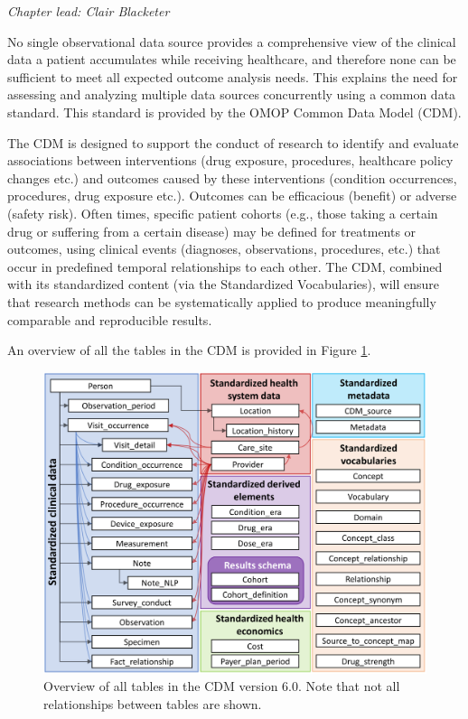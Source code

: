 \documentclass[11pt]{book}
\theoremstyle{definition}
\theoremstyle{definition}
\theoremstyle{definition}
\theoremstyle{remark}
\begin{document}
\emph{Chapter lead: Clair Blacketer}

No single observational data source provides a comprehensive view of the clinical data a patient accumulates while receiving healthcare, and therefore none can be sufficient to meet all expected outcome analysis needs. This explains the need for assessing and analyzing multiple data sources concurrently using a common data standard. This standard is provided by the OMOP Common Data Model (CDM).

The CDM is designed to support the conduct of research to identify and evaluate associations between interventions (drug exposure, procedures, healthcare policy changes etc.) and outcomes caused by these interventions (condition occurrences, procedures, drug exposure etc.). Outcomes can be efficacious (benefit) or adverse (safety risk). Often times, specific patient cohorts (e.g., those taking a certain drug or suffering from a certain disease) may be defined for treatments or outcomes, using clinical events (diagnoses, observations, procedures, etc.) that occur in predefined temporal relationships to each other. The CDM, combined with its standardized content (via the Standardized Vocabularies), will ensure that research methods can be systematically applied to produce meaningfully comparable and reproducible results.

An overview of all the tables in the CDM is provided in Figure \ref{fig:cdmDiagram}.

\begin{figure}
\includegraphics[width=1\linewidth]{images/CommonDataModel/cdmDiagram} \caption{Overview of all tables in the CDM version 6.0. Note that not all relationships between tables are shown.}\label{fig:cdmDiagram}
\end{figure}
\end{document}
